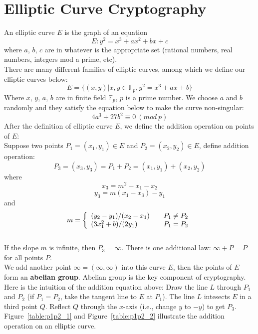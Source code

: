 \documentclass[10pt,a4paper]{article}
\begin{document}
\section{Elliptic Curve Cryptography}
\indent An elliptic curve $E$ is the graph of an equation
$$ E: y^2 = x^3 + ax^2 + bx + c $$
where $a$, $b$, $c$ are in whatever is the appropriate set (rational numbers, real numbers, integers mod a prime, etc). \\
\indent There are many different families of elliptic curves, among which we define our elliptic curves below:
$$ E = \{(x, y) | x,y \in \mathbb{F}_p, y^2 = x^3 + ax + b\} $$
\indent Where $x$, $y$, $a$, $b$ are in finite field $\mathbb{F}_p$, $p$ is a prime number. We choose $a$ and $b$ randomly and they satisfy the equation below to make the curve non-singular: $$ 4a^3 + 27b^2 \equiv 0\ (mod\ p) $$
\indent After the definition of elliptic curve $E$, we define the addition operation on points of $E$:\\
\indent Suppose two points $P_1 = (x_1, y_1) \in E$ and $P_2 = (x_2, y_2) \in E$, define addition operation:
$$ P_3 = (x_3, y_3) = P_1 + P_2 = (x_1, y_1) + (x_2, y_2) $$
where $$ x_3 = m^2 - x_1 - x_2 $$
$$ y_3 = m(x_1 - x_3) - y_1 $$
and 
$$m = \left\{
	\begin{array}{l l}
    	(y_2 - y_1)/(x_2 - x_1) & \quad P_1 \neq P_2\\
    	(3x_1^2 + b)/(2y_1) & \quad P_1 = P_2
  	\end{array} \right.$$\\
\indent If the slope $m$ is infinite, then $P_3 = \infty$. There is one additional law: $\infty + P = P$ for all points $P$.\\
\indent We add another point $\infty = (\infty, \infty)$ into this curve $E$, then the points of $E$ form an \textbf{abelian group}. Abelian group is the key component of cryptography. \\
\indent Here is the intuition of the addition equation above: Draw the line $L$ through $P_1$ and $P_2$ (if $P_1 = P_2$, take the tangent line to $E$ at $P_1$). The line $L$ intesects $E$ in a third point $Q$. Reflect $Q$ through the $x$-axis (i.e., change $y$ to $-y$) to get $P_3$. Figure~\ref{table:p1p2_1} and Figure~\ref{table:p1p2_2} illustrate the addition operation on an elliptic curve\cite{ECC Book}.
\end{document}
